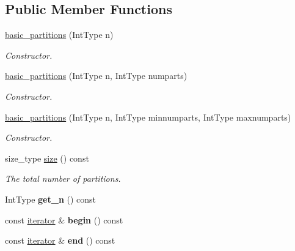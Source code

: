 \subsection*{Public Member Functions}
\begin{DoxyCompactItemize}
\item 
\hyperlink{classdscr_1_1basic__partitions_aa1bdcf6666b8b022a10c802aaeb4e71a}{basic\-\_\-partitions} (Int\-Type n)
\begin{DoxyCompactList}\small\item\em Constructor. \end{DoxyCompactList}\item 
\hyperlink{classdscr_1_1basic__partitions_a6759372b4d07f46377a9471d64a37117}{basic\-\_\-partitions} (Int\-Type n, Int\-Type numparts)
\begin{DoxyCompactList}\small\item\em Constructor. \end{DoxyCompactList}\item 
\hyperlink{classdscr_1_1basic__partitions_a9bd23836e73aa13efedf109b1827cdc0}{basic\-\_\-partitions} (Int\-Type n, Int\-Type minnumparts, Int\-Type maxnumparts)
\begin{DoxyCompactList}\small\item\em Constructor. \end{DoxyCompactList}\item 
size\-\_\-type \hyperlink{classdscr_1_1basic__partitions_a3704e667fcafed71d91a75012183f6dc}{size} () const 
\begin{DoxyCompactList}\small\item\em The total number of partitions. \end{DoxyCompactList}\item 
\hypertarget{classdscr_1_1basic__partitions_a16ad5a5a3befa80b635a3d3572619cd4}{Int\-Type {\bfseries get\-\_\-n} () const }\label{classdscr_1_1basic__partitions_a16ad5a5a3befa80b635a3d3572619cd4}

\item 
\hypertarget{classdscr_1_1basic__partitions_ab28b04cb9c2905c1de921a51f1d427b3}{const \hyperlink{classdscr_1_1basic__partitions_1_1iterator}{iterator} \& {\bfseries begin} () const }\label{classdscr_1_1basic__partitions_ab28b04cb9c2905c1de921a51f1d427b3}

\item 
\hypertarget{classdscr_1_1basic__partitions_a8e5a436ba43707b0b269df0d264f8a81}{const \hyperlink{classdscr_1_1basic__partitions_1_1iterator}{iterator} \& {\bfseries end} () const }\label{classdscr_1_1basic__partitions_a8e5a436ba43707b0b269df0d264f8a81}

\end{DoxyCompactItemize}
